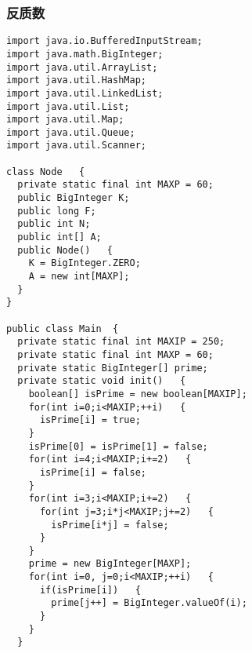 \subsubsection{反质数}
\begin{verbatim}
import java.io.BufferedInputStream;   
import java.math.BigInteger;   
import java.util.ArrayList;   
import java.util.HashMap;   
import java.util.LinkedList;   
import java.util.List;   
import java.util.Map;   
import java.util.Queue;   
import java.util.Scanner;   

class Node   {   
  private static final int MAXP = 60;   
  public BigInteger K;   
  public long F;   
  public int N;   
  public int[] A;   
  public Node()   {   
    K = BigInteger.ZERO;   
    A = new int[MAXP];   
  }   
}   

public class Main  {   
  private static final int MAXIP = 250;   
  private static final int MAXP = 60;   
  private static BigInteger[] prime;   
  private static void init()   {   
    boolean[] isPrime = new boolean[MAXIP];   
    for(int i=0;i<MAXIP;++i)   {   
      isPrime[i] = true;   
    }   
    isPrime[0] = isPrime[1] = false;   
    for(int i=4;i<MAXIP;i+=2)   {   
      isPrime[i] = false;   
    }   
    for(int i=3;i<MAXIP;i+=2)   {   
      for(int j=3;i*j<MAXIP;j+=2)   {   
        isPrime[i*j] = false;   
      }   
    }   
    prime = new BigInteger[MAXP];   
    for(int i=0, j=0;i<MAXIP;++i)   {   
      if(isPrime[i])   {   
        prime[j++] = BigInteger.valueOf(i);   
      }   
    }   
  }   


\end{verbatim}
